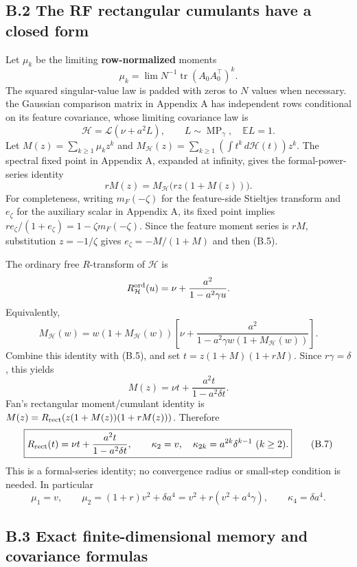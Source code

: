 \documentclass[
  11pt,
  a4paper,
]{article}
\begin{document}
\hypertarget{b.2-the-rf-rectangular-cumulants-have-a-closed-form}{%
\subsection{B.2 The RF rectangular cumulants have a closed
form}\label{b.2-the-rf-rectangular-cumulants-have-a-closed-form}}

Let \(\mu_k\) be the limiting \textbf{row-normalized} moments \[
\mu_k=\lim N^{-1}\operatorname{tr}(A_0A_0^\top)^k.
\] The squared singular-value law is padded with zeros to \(N\) values
when necessary. the Gaussian comparison matrix in Appendix A has
independent rows conditional on its feature covariance, whose limiting
covariance law is \[
\mathcal H=\mathcal L(\nu+a^2 L),\qquad L\sim\operatorname{MP}_{\gamma},
\quad \mathbb EL=1.
\] Let \(M(z)=\sum_{k\ge1}\mu_kz^k\) and
\(M_{\mathcal H}(z)=\sum_{k\ge1}(\int t^k\,d\mathcal H(t))z^k\). The
spectral fixed point in Appendix A, expanded at infinity, gives the
formal-power-series identity \[
rM(z)=M_{\mathcal H}\big(rz(1+M(z))\big).
\tag{B.5}
\] For completeness, writing \(m_F(-\zeta)\) for the feature-side
Stieltjes transform and \(e_\zeta\) for the auxiliary scalar in Appendix
A, its fixed point implies
\(r e_\zeta/(1+e_\zeta)=1-\zeta m_F(-\zeta)\). Since the feature moment
series is \(rM\), substitution \(z=-1/\zeta\) gives \(e_\zeta=-M/(1+M)\)
and then (B.5).

The ordinary free \(R\)-transform of \(\mathcal H\) is \[
R_{\mathcal H}^{\rm ord}(u)=\nu+\frac{a^2}{1-a^2\gamma u}.
\] Equivalently, \[
M_{\mathcal H}(w)=w(1+M_{\mathcal H}(w))
\left[\nu+\frac{a^2}{1-a^2\gamma w(1+M_{\mathcal H}(w))}\right].
\] Combine this identity with (B.5), and set \(t=z(1+M)(1+rM)\). Since
\(r\gamma=\delta\), this yields \[
M(z)=\nu t+\frac{a^2t}{1-a^2\delta t}.
\tag{B.6}
\] Fan's rectangular moment/cumulant identity is
\(M(z)=R_{\rm rect}(z(1+M(z))(1+rM(z)))\). Therefore \[
\boxed{R_{\rm rect}(t)=\nu t+\frac{a^2t}{1-a^2\delta t},\qquad
\kappa_2=v,\quad\kappa_{2k}=a^{2k}\delta^{k-1}\ (k\ge2).}
\tag{B.7}
\] This is a formal-series identity; no convergence radius or small-step
condition is needed. In particular \[
\mu_1=v,\qquad
\mu_2=(1+r)v^2+\delta a^4
=v^2+r(v^2+a^4\gamma),\qquad \kappa_4=\delta a^4.
\tag{B.8}
\]

\hypertarget{b.3-exact-finite-dimensional-memory-and-covariance-formulas}{%
\subsection{B.3 Exact finite-dimensional memory and covariance
formulas}\label{b.3-exact-finite-dimensional-memory-and-covariance-formulas}}
\end{document}
